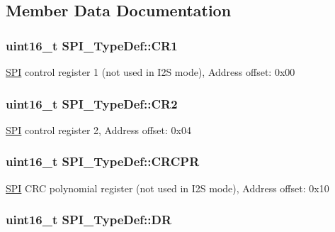 \subsection{Member Data Documentation}
\hypertarget{struct_s_p_i___type_def_a1e398155ddd013fcdd41309b4bd0bd5f}{
\subsubsection[{C\-R1}]{ uint16\-\_\-t S\-P\-I\-\_\-\-Type\-Def\-::\-C\-R1}}\label{struct_s_p_i___type_def_a1e398155ddd013fcdd41309b4bd0bd5f}
\hyperlink{class_s_p_i}{S\-P\-I} control register 1 (not used in I2\-S mode), Address offset\-: 0x00 \hypertarget{struct_s_p_i___type_def_ac891e34644b8dc27bacc906cfd18b235}{
\subsubsection[{C\-R2}]{ uint16\-\_\-t S\-P\-I\-\_\-\-Type\-Def\-::\-C\-R2}}\label{struct_s_p_i___type_def_ac891e34644b8dc27bacc906cfd18b235}
\hyperlink{class_s_p_i}{S\-P\-I} control register 2, Address offset\-: 0x04 \hypertarget{struct_s_p_i___type_def_a353c64e49ec9ae93b950668941f41175}{
\subsubsection[{C\-R\-C\-P\-R}]{ uint16\-\_\-t S\-P\-I\-\_\-\-Type\-Def\-::\-C\-R\-C\-P\-R}}\label{struct_s_p_i___type_def_a353c64e49ec9ae93b950668941f41175}
\hyperlink{class_s_p_i}{S\-P\-I} C\-R\-C polynomial register (not used in I2\-S mode), Address offset\-: 0x10 \hypertarget{struct_s_p_i___type_def_ae192c943732b6ab5e5611e860cc05544}{
\subsubsection[{D\-R}]{ uint16\-\_\-t S\-P\-I\-\_\-\-Type\-Def\-::\-D\-R}}\label{struct_s_p_i___type_def_ae192c943732b6ab5e5611e860cc05544}
